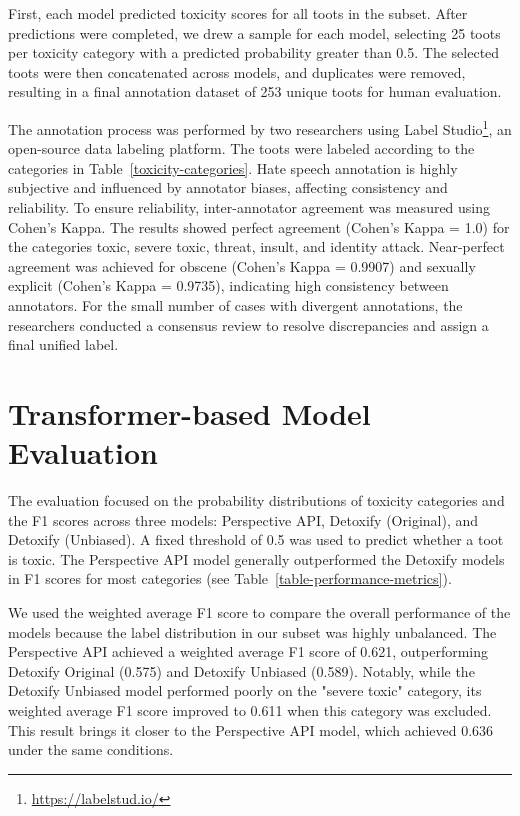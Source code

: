 First, each model predicted toxicity scores for all toots in the subset. After predictions were completed, we drew a sample for each model, selecting 25 toots per toxicity category with a predicted probability greater than 0.5. The selected toots were then concatenated across models, and duplicates were removed, resulting in a final annotation dataset of 253 unique toots for human evaluation.

The annotation process was performed by two researchers using Label Studio\footnote{\url{https://labelstud.io/}}, an open-source data labeling platform. The toots were labeled according to the categories in Table~\ref{toxicity-categories}. Hate speech annotation is highly subjective and influenced by annotator biases, affecting consistency and reliability. To ensure reliability, inter-annotator agreement was measured using Cohen's Kappa. The results showed perfect agreement (Cohen's Kappa = 1.0) for the categories toxic, severe toxic, threat, insult, and identity attack. Near-perfect agreement was achieved for obscene (Cohen's Kappa = 0.9907) and sexually explicit (Cohen's Kappa = 0.9735), indicating high consistency between annotators. For the small number of cases with divergent annotations, the researchers conducted a consensus review to resolve discrepancies and assign a final unified label.

\section{Transformer-based Model Evaluation} \label{evaluation}
The evaluation focused on the probability distributions of toxicity categories and the F1 scores across three models: Perspective API, Detoxify (Original), and Detoxify (Unbiased). A fixed threshold of 0.5 was used to predict whether a toot is toxic. The Perspective API model generally outperformed the Detoxify models in F1 scores for most categories (see Table~\ref{table-performance-metrics}).

We used the weighted average F1 score to compare the overall performance of the models because the label distribution in our subset was highly unbalanced. The Perspective API achieved a weighted average F1 score of 0.621, outperforming Detoxify Original (0.575) and Detoxify Unbiased (0.589). Notably, while the Detoxify Unbiased model performed poorly on the "severe toxic" category, its weighted average F1 score improved to 0.611 when this category was excluded. This result brings it closer to the Perspective API model, which achieved 0.636 under the same conditions.

